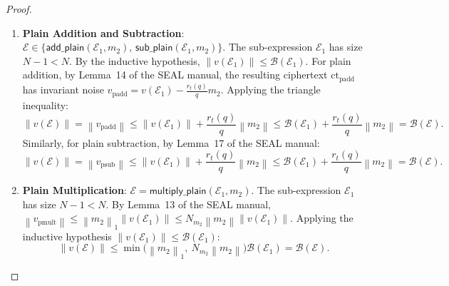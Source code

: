 \documentclass[11pt]{article}
\theoremstyle{definition}
\theoremstyle{remark}
\newcommand{\norm}[1]{\left\lVert #1\right\rVert}
\newcommand{\ctpadd}{\mathrm{ct}_{\mathrm{padd}}}
\newcommand{\vpadd}{v_{\mathrm{padd}}}
\newcommand{\vpsub}{v_{\mathrm{psub}}}
\newcommand{\vpmult}{v_{\mathrm{pmult}}}
\begin{document}
\begin{proof}
\begin{enumerate}[leftmargin=2em]
\item \textbf{Plain Addition and Subtraction}: $\mathcal{E} \in \{\mathsf{add\_plain}(\mathcal{E}_1, m_2),\, \mathsf{sub\_plain}(\mathcal{E}_1, m_2)\}$.
      The sub-expression $\mathcal{E}_1$ has size $N-1 < N$.
      By the inductive hypothesis, $\norm{v(\mathcal{E}_1)} \leq \mathcal{B}(\mathcal{E}_1)$.
      For plain addition, by Lemma~14 of the SEAL manual, the resulting ciphertext $\ctpadd$ has invariant noise
      $\vpadd = v(\mathcal{E}_1) - \frac{r_t(q)}{q}m_2$.
      Applying the triangle inequality:
      \[
        \norm{v(\mathcal{E})} = \norm{\vpadd} \leq \norm{v(\mathcal{E}_1)} + \frac{r_t(q)}{q}\norm{m_2} \leq \mathcal{B}(\mathcal{E}_1) + \frac{r_t(q)}{q}\norm{m_2} = \mathcal{B}(\mathcal{E}).
      \]
      Similarly, for plain subtraction, by Lemma~17 of the SEAL manual:
      \[
        \norm{v(\mathcal{E})} = \norm{\vpsub} \leq \norm{v(\mathcal{E}_1)} + \frac{r_t(q)}{q}\norm{m_2} \leq \mathcal{B}(\mathcal{E}_1) + \frac{r_t(q)}{q}\norm{m_2} = \mathcal{B}(\mathcal{E}).
      \]

\item \textbf{Plain Multiplication}: $\mathcal{E} = \mathsf{multiply\_plain}(\mathcal{E}_1, m_2)$.
      The sub-expression $\mathcal{E}_1$ has size $N-1 < N$.
      By Lemma~13 of the SEAL manual, $\norm{\vpmult} \leq \norm{m_2}_1 \norm{v(\mathcal{E}_1)} \leq N_{m_2}\norm{m_2}\norm{v(\mathcal{E}_1)}$.
      Applying the inductive hypothesis $\norm{v(\mathcal{E}_1)} \leq \mathcal{B}(\mathcal{E}_1)$:
      \[
        \norm{v(\mathcal{E})} \leq \min\bigl(\norm{m_2}_1,\ N_{m_2}\norm{m_2}\bigr)\mathcal{B}(\mathcal{E}_1) = \mathcal{B}(\mathcal{E}).
      \]


\end{enumerate}
\end{proof}
\end{document}
